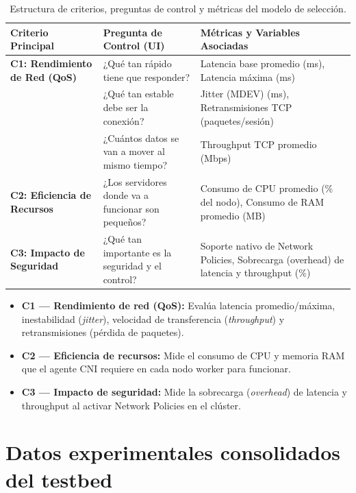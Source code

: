 \begin{table}[htbp]
\centering
\scriptsize
\caption{Estructura de criterios, preguntas de control y métricas del modelo de selección.}
\label{tab:apb_criterios}
\begin{tabularx}{\textwidth}{|l|l|Y|}
\hline
\textbf{Criterio Principal} & \textbf{Pregunta de Control (UI)} & \textbf{Métricas y Variables Asociadas} \\
\hline
\textbf{C1: Rendimiento de Red (QoS)} & ¿Qué tan rápido tiene que responder? & Latencia base promedio (ms), Latencia máxima (ms) \\
& ¿Qué tan estable debe ser la conexión? & Jitter (MDEV) (ms), Retransmisiones TCP (paquetes/sesión) \\
& ¿Cuántos datos se van a mover al mismo tiempo? & Throughput TCP promedio (Mbps) \\
\hline
\textbf{C2: Eficiencia de Recursos} & ¿Los servidores donde va a funcionar son pequeños? & Consumo de CPU promedio (\% del nodo), Consumo de RAM promedio (MB) \\
\hline
\textbf{C3: Impacto de Seguridad} & ¿Qué tan importante es la seguridad y el control? & Soporte nativo de Network Policies, Sobrecarga (overhead) de latencia y throughput (\%) \\
\hline
\end{tabularx}
\end{table}

\begin{itemize}
  \item \textbf{C1 --- Rendimiento de red (QoS):} Evalúa latencia promedio/máxima, inestabilidad (\emph{jitter}), velocidad de transferencia (\emph{throughput}) y retransmisiones (pérdida de paquetes).
  \item \textbf{C2 --- Eficiencia de recursos:} Mide el consumo de CPU y memoria RAM que el agente CNI requiere en cada nodo worker para funcionar.
  \item \textbf{C3 --- Impacto de seguridad:} Mide la sobrecarga (\emph{overhead}) de latencia y throughput al activar Network Policies en el clúster.
\end{itemize}

\section{Datos experimentales consolidados del testbed} \label{sec:apb_datos}


